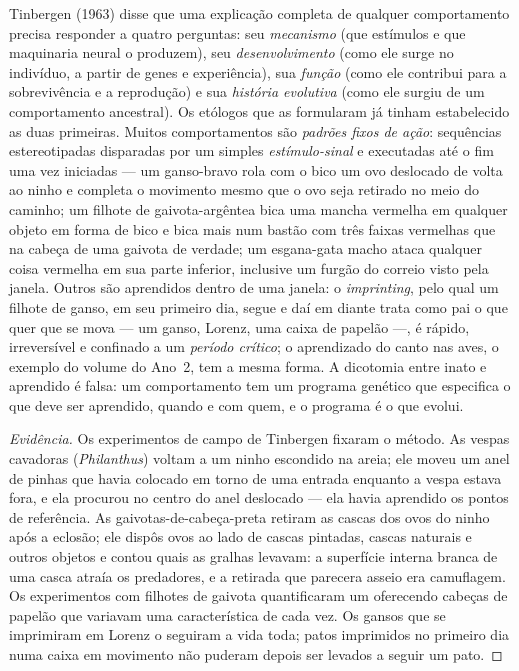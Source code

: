 \begin{definition}\label{def:b3:behavioural-ecology:tinbergen}
Tinbergen (1963) disse que uma explicação completa de qualquer
comportamento precisa responder a quatro perguntas: seu \emph{mecanismo}
(que estímulos e que maquinaria neural o produzem), seu
\emph{desenvolvimento} (como ele surge no indivíduo, a partir de genes e
experiência), sua \emph{função} (como ele contribui para a sobrevivência
e a reprodução) e sua \emph{história evolutiva} (como ele surgiu de um
comportamento ancestral). Os etólogos que as formularam já tinham
estabelecido as duas primeiras. Muitos comportamentos são \emph{padrões
fixos de ação}: sequências estereotipadas disparadas por um simples
\emph{estímulo-sinal} e executadas até o fim uma vez iniciadas --- um
ganso-bravo rola com o bico um ovo deslocado de volta ao ninho e completa
o movimento mesmo que o ovo seja retirado no meio do caminho; um filhote
de gaivota-argêntea bica uma mancha vermelha em qualquer objeto em forma
de bico e bica mais num bastão com três faixas vermelhas que na cabeça de
uma gaivota de verdade; um esgana-gata macho ataca qualquer coisa
vermelha em sua parte inferior, inclusive um furgão do correio visto pela
janela. Outros são aprendidos dentro de uma janela: o \emph{imprinting},
pelo qual um filhote de ganso, em seu primeiro dia, segue e daí em diante
trata como pai o que quer que se mova --- um ganso, Lorenz, uma caixa de
papelão ---, é rápido, irreversível e confinado a um \emph{período
crítico}; o aprendizado do canto nas aves, o exemplo do volume do Ano~2,
tem a mesma forma. A dicotomia entre inato e aprendido é falsa: um
comportamento tem um programa genético que especifica o que deve ser
aprendido, quando e com quem, e o programa é o que evolui.
\end{definition}

\begin{proof}[Evidência]
Os experimentos de campo de Tinbergen fixaram o método. As vespas
cavadoras (\emph{Philanthus}) voltam a um ninho escondido na areia; ele
moveu um anel de pinhas que havia colocado em torno de uma entrada
enquanto a vespa estava fora, e ela procurou no centro do anel deslocado
--- ela havia aprendido os pontos de referência. As gaivotas-de-cabeça-preta
retiram as cascas dos ovos do ninho após a eclosão; ele dispôs ovos ao
lado de cascas pintadas, cascas naturais e outros objetos e contou quais
as gralhas levavam: a superfície interna branca de uma casca atraía os
predadores, e a retirada que parecera asseio era camuflagem. Os
experimentos com filhotes de gaivota quantificaram um 
oferecendo cabeças de papelão que variavam uma característica de cada
vez. Os gansos que se imprimiram em Lorenz o seguiram a vida toda; patos
imprimidos no primeiro dia numa caixa em movimento não puderam depois ser
levados a seguir um pato.
\end{proof}

